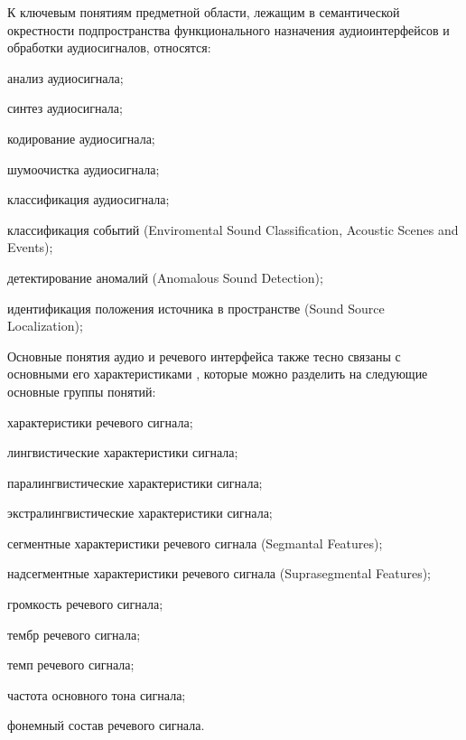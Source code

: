 К ключевым понятиям предметной области, лежащим в семантической окрестности подпространства функционального назначения аудиоинтерфейсов и обработки аудиосигналов, относятся:
\begin{textitemize}    
    \item анализ аудиосигнала;
    \item синтез аудиосигнала;
    \item кодирование аудиосигнала;
    \item шумоочистка аудиосигнала;
    \item классификация аудиосигнала;
    \item классификация событий (Enviromental Sound Classification, Acoustic Scenes and Events);
    \item детектирование аномалий (Anomalous Sound Detection);
    \item идентификация положения источника в пространстве (Sound Source Localization);
\end{textitemize}

Основные понятия аудио и речевого интерфейса также тесно связаны с основными его характеристиками \textit{}, которые можно разделить на следующие основные группы понятий:
\begin{textitemize}
    \item характеристики речевого сигнала;
    \item лингвистические характеристики сигнала;
    \item паралингвистические характеристики сигнала;
    \item экстралингвистические характеристики сигнала;
    \item сегментные характеристики речевого сигнала (Segmantal Features);
    \item надсегментные характеристики речевого сигнала (Suprasegmental Features);
    \item громкость речевого сигнала;
    \item тембр речевого сигнала;
    \item темп речевого сигнала;
    \item частота основного тона сигнала;
    \item фонемный состав речевого сигнала.
\end{textitemize}



